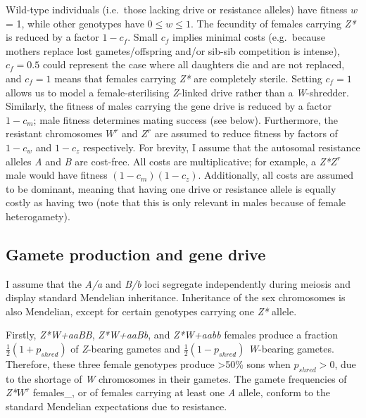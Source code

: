 \documentclass[]{rsos}%
\begin{document}
Wild-type individuals (i.e.~those lacking drive or resistance alleles)
have fitness \(w\) = 1, while other genotypes have \(0 \le w \le 1\).
The fecundity of females carrying \emph{Z*} is reduced by a factor
\(1 - c_f\). Small \(c_f\) implies minimal costs (e.g.~because mothers
replace lost gametes/offspring and/or sib-sib competition is intense),
\(c_f = 0.5\) could represent the case where all daughters die and are
not replaced, and \(c_f = 1\) means that females carrying \emph{Z*} are
completely sterile. Setting \(c_f = 1\) allows us to model a
female-sterilising \emph{Z}-linked drive rather than a
\emph{W}-shredder. Similarly, the fitness of males carrying the gene
drive is reduced by a factor \(1 - c_m\); male fitness determines mating
success (see below). Furthermore, the resistant chromosomes \(W^r\) and
\(Z^r\) are assumed to reduce fitness by factors of \(1 - c_w\) and
\(1 - c_z\) respectively. For brevity, I assume that the autosomal
resistance alleles \emph{A} and \emph{B} are cost-free. All costs are
multiplicative; for example, a \emph{Z*}\(Z^r\) male would have fitness
\((1 - c_m)(1 - c_z)\). Additionally, all costs are assumed to be
dominant, meaning that having one drive or resistance allele is equally
costly as having two (note that this is only relevant in males because
of female heterogamety).

\hypertarget{gamete-production-and-gene-drive}{%
\subsection{Gamete production and gene
drive}\label{gamete-production-and-gene-drive}}

I assume that the \emph{A/a} and \emph{B/b} loci segregate independently
during meiosis and display standard Mendelian inheritance. Inheritance
of the sex chromosomes is also Mendelian, except for certain genotypes
carrying one \emph{Z*} allele.

Firstly, \emph{Z*W+aaBB}, \emph{Z*W+aaBb}, and \emph{Z*W+aabb} females
produce a fraction \(\frac{1}{2}(1 + p_{shred})\) of \emph{Z}-bearing
gametes and \(\frac{1}{2}(1 - p_{shred})\) \emph{W}-bearing gametes.
Therefore, these three female genotypes produce \textgreater{}50\% sons
when \(p_{shred} > 0\), due to the shortage of \emph{W} chromosomes in
their gametes. The gamete frequencies of \emph{Z*}\(W^r\) females\_, or
of females carrying at least one \emph{A} allele, conform to the
standard Mendelian expectations due to resistance.
\end{document}

